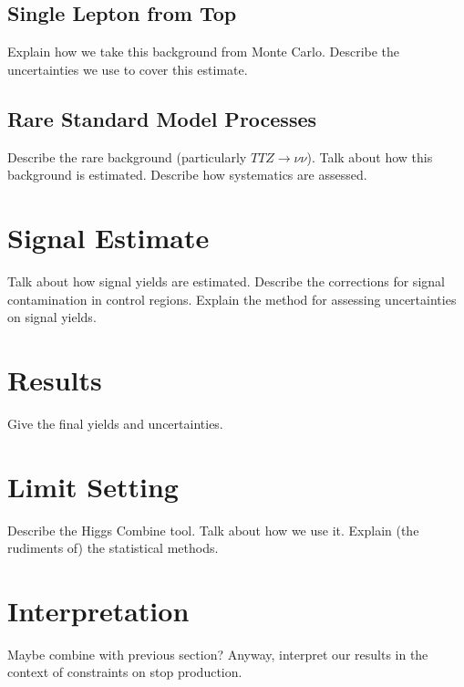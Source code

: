 \subsection{Single Lepton from Top}
\label{ssec:stop:1ltop}

Explain how we take this background from Monte Carlo.
Describe the uncertainties we use to cover this estimate.

\subsection{Rare Standard Model Processes}
\label{ssec:stop:1lrare}

Describe the rare background (particularly $TTZ \rightarrow \nu\nu$).
Talk about how this background is estimated.
Describe how systematics are assessed.

\section{Signal Estimate}
\label{sec:stop:signal}

Talk about how signal yields are estimated.
Describe the corrections for signal contamination in control regions.
Explain the method for assessing uncertainties on signal yields.

\section{Results}
\label{sec:stop:results}

Give the final yields and uncertainties.

\section{Limit Setting}
\label{sec:stop:limits}

Describe the Higgs Combine tool.
Talk about how we use it.
Explain (the rudiments of) the statistical methods.

\section{Interpretation}
\label{sec:stop:interp}

Maybe combine with previous section?
Anyway, interpret our results in the context of constraints on stop production.

